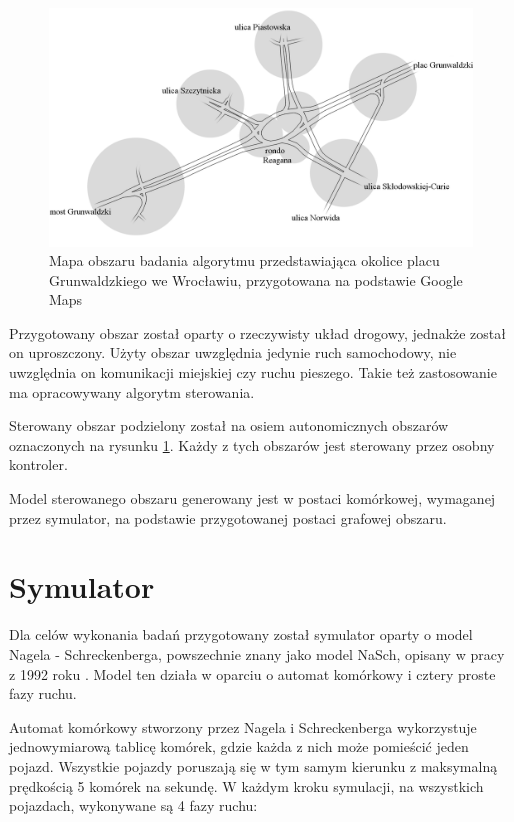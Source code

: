 \begin{figure}[h]
    \centering
    \includegraphics[width=1.0\textwidth]{images/mapa_czysta.png}
    \caption{Mapa obszaru badania algorytmu przedstawiająca okolice placu Grunwaldzkiego we Wrocławiu, przygotowana na podstawie Google Maps \cite{google_maps}}
    \label{fig:mapa_czysta}
\end{figure}

Przygotowany obszar został oparty o rzeczywisty układ drogowy, jednakże został on uproszczony. Użyty obszar uwzględnia jedynie ruch samochodowy, nie uwzględnia on komunikacji miejskiej czy ruchu pieszego. Takie też zastosowanie ma opracowywany algorytm sterowania.

Sterowany obszar podzielony został na osiem autonomicznych obszarów oznaczonych na rysunku \ref{fig:mapa_czysta}. Każdy z tych obszarów jest sterowany przez osobny kontroler.

Model sterowanego obszaru generowany jest w postaci komórkowej, wymaganej przez symulator, na podstawie przygotowanej postaci grafowej obszaru.

\section{Symulator}
\label{chap:symulacja}
Dla celów wykonania badań przygotowany został symulator oparty o model Nagela - Schreckenberga, powszechnie znany jako model NaSch, opisany w pracy z 1992 roku \cite{nasch}. Model ten działa w oparciu o automat komórkowy i cztery proste fazy ruchu.

Automat komórkowy stworzony przez Nagela i Schreckenberga wykorzystuje jednowymiarową tablicę komórek, gdzie każda z nich może pomieścić jeden pojazd. Wszystkie pojazdy poruszają się w tym samym kierunku z maksymalną prędkością 5 komórek na sekundę. W każdym kroku symulacji, na wszystkich pojazdach, wykonywane są 4 fazy ruchu:

